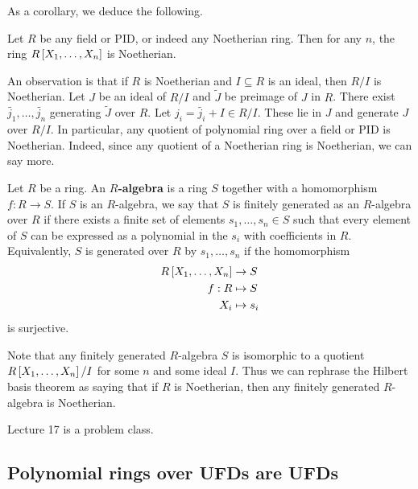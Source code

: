 As a corollary, we deduce the following.

\begin{corollary}
Let $ R $ be any field or PID, or indeed any Noetherian ring. Then for any $ n $, the ring $ R\sb{X_1, \dots, X_n} $ is Noetherian.
\end{corollary}

An observation is that if $ R $ is Noetherian and $ I \subseteq R $ is an ideal, then $ R / I $ is Noetherian. Let $ J $ be an ideal of $ R / I $ and $ \widetilde{J} $ be preimage of $ J $ in $ R $. There exist $ \widetilde{j_1}, \dots, \widetilde{j_n} $ generating $ \widetilde{J} $ over $ R $. Let $ j_i = \widetilde{j_i} + I \in R / I $. These lie in $ J $ and generate $ J $ over $ R / I $. In particular, any quotient of polynomial ring over a field or PID is Noetherian. Indeed, since any quotient of a Noetherian ring is Noetherian, we can say more.

\begin{definition}
Let $ R $ be a ring. An \textbf{$ R $-algebra} is a ring $ S $ together with a homomorphism $ f : R \to S $. If $ S $ is an $ R $-algebra, we say that $ S $ is finitely generated as an $ R $-algebra over $ R $ if there exists a finite set of elements $ s_1, \dots, s_n \in S $ such that every element of $ S $ can be expressed as a polynomial in the $ s_i $ with coefficients in $ R $. Equivalently, $ S $ is generated over $ R $ by $ s_1, \dots, s_n $ if the homomorphism
\begin{align*}
R\sb{X_1, \dots, X_n} & \to S \\
f : R & \mapsto S \\
X_i & \mapsto s_i
\end{align*}
is surjective.
\end{definition}

Note that any finitely generated $ R $-algebra $ S $ is isomorphic to a quotient $ R\sb{X_1, \dots, X_n} / I $ for some $ n $ and some ideal $ I $. Thus we can rephrase the Hilbert basis theorem as saying that if $ R $ is Noetherian, then any finitely generated $ R $-algebra is Noetherian.


Lecture 17 is a problem class.


\subsection{Polynomial rings over UFDs are UFDs}

